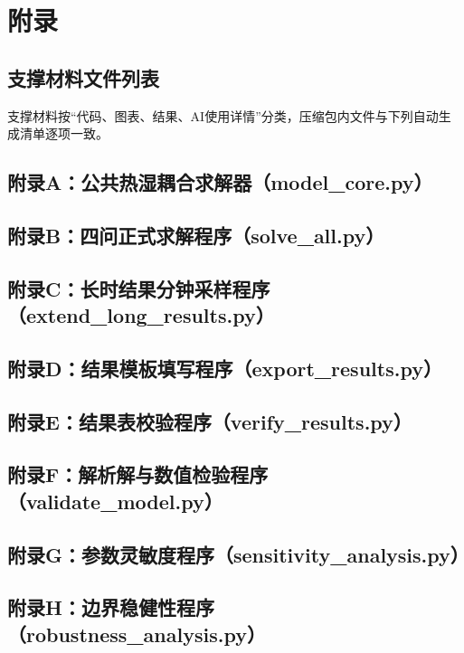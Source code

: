 \documentclass[zihao=-4,UTF8]{ctexart}
\begin{document}
\clearpage
\section*{附录}
\subsection*{支撑材料文件列表}
支撑材料按“代码、图表、结果、AI使用详情”分类，压缩包内文件与下列自动生成清单逐项一致。

\subsection*{附录A：公共热湿耦合求解器（model\_core.py）}

\subsection*{附录B：四问正式求解程序（solve\_all.py）}

\subsection*{附录C：长时结果分钟采样程序（extend\_long\_results.py）}

\subsection*{附录D：结果模板填写程序（export\_results.py）}

\subsection*{附录E：结果表校验程序（verify\_results.py）}

\subsection*{附录F：解析解与数值检验程序（validate\_model.py）}

\subsection*{附录G：参数灵敏度程序（sensitivity\_analysis.py）}

\subsection*{附录H：边界稳健性程序（robustness\_analysis.py）}

\end{document}
